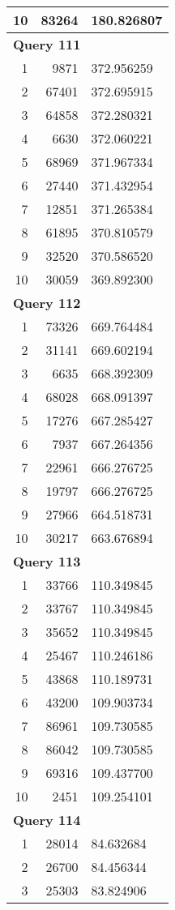 \begin{longtable}[{p}]{@{}rrp{}@{}}
10 & 83264 & 180.826807 \\
\midrule
\multicolumn{3}{l}{\bfseries Query 111} \\
1 & 9871 & 372.956259 \\
2 & 67401 & 372.695915 \\
3 & 64858 & 372.280321 \\
4 & 6630 & 372.060221 \\
5 & 68969 & 371.967334 \\
6 & 27440 & 371.432954 \\
7 & 12851 & 371.265384 \\
8 & 61895 & 370.810579 \\
9 & 32520 & 370.586520 \\
10 & 30059 & 369.892300 \\
\midrule
\multicolumn{3}{l}{\bfseries Query 112} \\
1 & 73326 & 669.764484 \\
2 & 31141 & 669.602194 \\
3 & 6635 & 668.392309 \\
4 & 68028 & 668.091397 \\
5 & 17276 & 667.285427 \\
6 & 7937 & 667.264356 \\
7 & 22961 & 666.276725 \\
8 & 19797 & 666.276725 \\
9 & 27966 & 664.518731 \\
10 & 30217 & 663.676894 \\
\midrule
\multicolumn{3}{l}{\bfseries Query 113} \\
1 & 33766 & 110.349845 \\
2 & 33767 & 110.349845 \\
3 & 35652 & 110.349845 \\
4 & 25467 & 110.246186 \\
5 & 43868 & 110.189731 \\
6 & 43200 & 109.903734 \\
7 & 86961 & 109.730585 \\
8 & 86042 & 109.730585 \\
9 & 69316 & 109.437700 \\
10 & 2451 & 109.254101 \\
\midrule
\multicolumn{3}{l}{\bfseries Query 114} \\
1 & 28014 & 84.632684 \\
2 & 26700 & 84.456344 \\
3 & 25303 & 83.824906 \\

\end{longtable}
